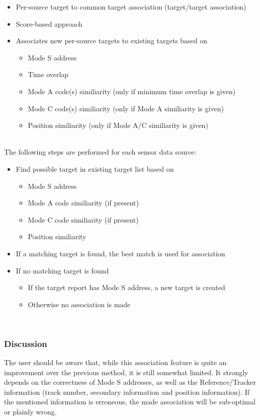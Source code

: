 \begin{itemize}
\item Per-source target to common target association (target/target association)
\item Score-based approach
\item Associates new per-source targets to existing targets based on
\begin{itemize}
\item Mode S address
\item Time overlap
\item Mode A code(s) similiarity (only if minimum time overlap is given)
\item Mode C code(s) similiarity (only if Mode A similiarity is given)
\item Position similiarity (only if Mode A/C similiarity is given)
\end{itemize}
\end{itemize}
\ \\


The following steps are performed for each sensor data source:
\begin{itemize}
\item Find possible target in existing target list based on
\begin{itemize}
\item Mode S address
\item Mode A code similiarity (if present)
\item Mode C code similiarity (if present)
\item Position similiarity
\end{itemize}
\item If a matching target is found, the best match is used for association
\item If no matching target is found
\begin{itemize}
\item If the target report has Mode S address, a new target is created
\item Otherwise no association is made
\end{itemize}
\end{itemize}
\ \\


\subsubsection{Discussion}

The user should be aware that, while this association feature is quite an improvement over the previous method, it is still somewhat limited. It strongly depends on the correctness of Mode S addresses, as well as the Reference/Tracker information (track number, secondary information and position information). If the mentioned information is erroneous, the made association will be sub-optimal or plainly wrong. \\

